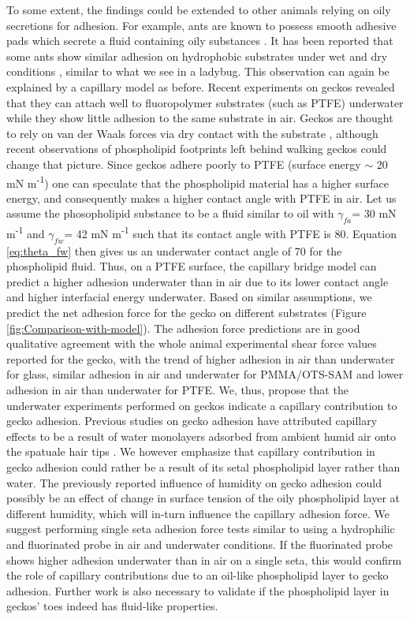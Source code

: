 \documentclass[vruler,JEB]{COB}%
\begin{document}
To some extent, the findings could be extended to other animals relying on oily
secretions for adhesion. For example, ants are known to possess smooth adhesive pads which secrete a fluid containing oily substances \citep{RN201}.
It has been reported that some ants show similar adhesion on hydrophobic substrates under wet and dry conditions \citep{RN213},
similar to what we see in a ladybug. This observation can again be explained by a capillary model as before. Recent experiments on
geckos revealed that they can attach well to fluoropolymer substrates (such as PTFE)
underwater while they show little adhesion to the same substrate in
air\citep{RN199,RN15}. Geckos are thought to rely on van der Waals
forces via dry contact with the substrate \citep{RN202}, although
recent observations of phospholipid footprints left behind walking
geckos \citep{RN205} could change that picture. Since geckos adhere
poorly to PTFE (surface energy $\sim$ 20 mN m\protect\textsuperscript{-1}) one can
speculate that the phospholipid material has a higher surface energy,
and consequently makes a higher contact angle with PTFE in air. Let
us assume the phosopholipid substance to be a fluid similar to oil 
with $\gamma_{fa}$= 30 mN m\protect\textsuperscript{-1} and $\gamma_{fw}$= 42 mN m\protect\textsuperscript{-1} such that
its contact angle with PTFE is 80\textdegree . Equation \ref{eq:theta_fw}
then gives us an underwater contact angle of 70\textdegree{} for the
phospholipid fluid. Thus, on a PTFE surface, the capillary bridge
model can predict a higher adhesion underwater than in air due to
its lower contact angle and higher interfacial energy underwater.
Based on similar assumptions, we predict the net adhesion force for
the gecko on different substrates (Figure \ref{fig:Comparison-with-model}).
The adhesion force predictions are in good qualitative agreement with
the whole animal experimental shear force values reported for the
gecko, with the trend of higher adhesion in air than underwater for
glass, similar adhesion in air and underwater for PMMA/OTS-SAM and
lower adhesion in air than underwater for PTFE. We, thus, propose
that the underwater experiments performed on geckos \citep{RN199,RN15}
indicate a capillary contribution to gecko adhesion. Previous studies on gecko adhesion have attributed capillary effects to be a result of water monolayers adsorbed from ambient humid air onto the spatuale hair tips \citep{RN197, RN203, RN218}.
We however emphasize that capillary contribution in gecko adhesion could rather be a result of its setal phospholipid layer rather than water.
The previously reported influence of humidity on gecko adhesion \citep{RN197} could possibly be an effect of change in surface tension of the oily phospholipid layer at different humidity, which will in-turn influence the capillary adhesion force. We suggest performing single seta adhesion force tests similar to \citep{RN202}
using a hydrophilic and fluorinated probe in air and underwater conditions. 
If the fluorinated probe shows higher adhesion underwater than in air on a single seta, this
would confirm the role of capillary contributions due to an oil-like phospholipid layer to gecko adhesion. Further work is also necessary to validate if the phospholipid layer in geckos' toes indeed has fluid-like properties.
\end{document}
